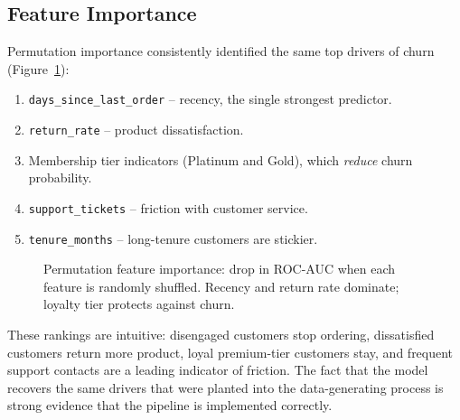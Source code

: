 \documentclass[11pt,a4paper]{article}
\begin{document}
\subsection{Feature Importance}

Permutation importance consistently identified the same top drivers
of churn (Figure~\ref{fig:fi}):
\begin{enumerate}
  \item \texttt{days\_since\_last\_order} -- recency, the single
        strongest predictor.
  \item \texttt{return\_rate} -- product dissatisfaction.
  \item Membership tier indicators (Platinum and Gold), which
        \emph{reduce} churn probability.
  \item \texttt{support\_tickets} -- friction with customer service.
  \item \texttt{tenure\_months} -- long-tenure customers are stickier.
\end{enumerate}

\begin{figure}[h]
\centering
{}
\caption{Permutation feature importance: drop in ROC-AUC when each
feature is randomly shuffled. Recency and return rate dominate;
loyalty tier protects against churn.}
\label{fig:fi}
\end{figure}

These rankings are intuitive: disengaged customers stop ordering,
dissatisfied customers return more product, loyal premium-tier
customers stay, and frequent support contacts are a leading indicator
of friction. The fact that the model recovers the same drivers that
were planted into the data-generating process is strong evidence that
the pipeline is implemented correctly.
\end{document}
